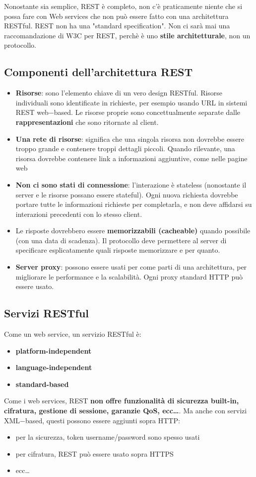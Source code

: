 Nonostante sia semplice, REST è completo, non c'è praticamente niente che si possa fare con Web services che non può essere fatto con una architettura RESTful. REST non ha una "standard specification". Non ci sarà mai una raccomandazione di W3C per REST, perchè è uno \textbf{stile architetturale}, non un protocollo.

\subsection{Componenti dell'architettura REST}
\begin{itemize}
    \item \textbf{Risorse}: sono l'elemento chiave di un vero design RESTful. Risorse individuali sono identificate in richieste, per esempio usando URL in sistemi REST web$-$based. Le risorse proprie sono concettualmente separate dalle \textbf{rappresentazioni} che sono ritornate al client. 
    \item \textbf{Una rete di risorse}: significa che una singola risorsa non dovrebbe essere troppo grande e contenere troppi dettagli piccoli. Quando rilevante, una risorsa dovrebbe contenere link a informazioni aggiuntive, come nelle pagine web
    \item \textbf{Non ci sono stati di connessione}: l'interazione è stateless (nonostante il server e le risorse possano essere stateful). Ogni nuova richiesta dovrebbe portare tutte le informazioni richieste per completarla, e non deve affidarsi su interazioni precedenti con lo stesso client. 
    \item Le risposte dovrebbero essere \textbf{memorizzabili (cacheable)} quando possibile (con una data di scadenza). Il protocollo deve permettere al server di specificare esplicatamente quali risposte memorizzare e per quanto.
    \item \textbf{Server proxy}: possono essere usati per come parti di una architettura, per migliorare le performance e la scalabilità. Ogni proxy standard HTTP può essere usato.  
\end{itemize}

\subsection{Servizi RESTful}
Come un web service, un servizio RESTful è:
\begin{itemize}
    \item \textbf{platform-independent}
    \item \textbf{language-independent}
    \item \textbf{standard-based}
\end{itemize}
Come i web services, REST \textbf{non offre funzionalità di sicurezza built-in, cifratura, gestione di sessione, garanzie QoS, ecc\dots}. Ma anche con servizi XML$-$based, questi possono essere aggiunti sopra HTTP:
\begin{itemize}
    \item per la sicurezza, token username/password sono spesso usati
    \item per cifratura, REST può essere usato sopra HTTPS
    \item ecc\dots
\end{itemize}


